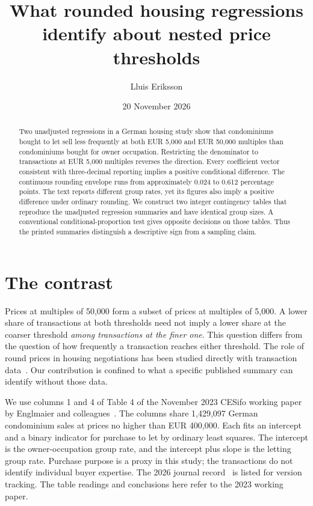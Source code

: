 \documentclass[11pt]{article}
\title{What rounded housing regressions identify about nested price thresholds}
\author{Lluis Eriksson}
\date{20 November 2026}
\begin{document}
\maketitle
\begin{abstract}
Two unadjusted regressions in a German housing study show that condominiums bought to let sell less frequently at both EUR 5,000 and EUR 50,000 multiples than condominiums bought for owner occupation. Restricting the denominator to transactions at EUR 5,000 multiples reverses the direction. Every coefficient vector consistent with three-decimal reporting implies a positive conditional difference. The continuous rounding envelope runs from approximately 0.024 to 0.612 percentage points. The text reports different group rates, yet its figures also imply a positive difference under ordinary rounding. We construct two integer contingency tables that reproduce the unadjusted regression summaries and have identical group sizes. A conventional conditional-proportion test gives opposite decisions on those tables. Thus the printed summaries distinguish a descriptive sign from a sampling claim.
\end{abstract}

\section{The contrast}
Prices at multiples of 50,000 form a subset of prices at multiples of 5,000. A lower share of transactions at both thresholds need not imply a lower share at the coarser threshold \emph{among transactions at the finer one}. This question differs from the question of how frequently a transaction reaches either threshold. The role of round prices in housing negotiations has been studied directly with transaction data~\cite{pope,german}. Our contribution is confined to what a specific published summary can identify without those data.

We use columns 1 and 4 of Table 4 of the November 2023 CESifo working paper by Englmaier and colleagues~\cite{german}. The columns share 1,429,097 German condominium sales at prices no higher than EUR 400,000. Each fits an intercept and a binary indicator for purchase to let by ordinary least squares. The intercept is the owner-occupation group rate, and the intercept plus slope is the letting group rate. Purchase purpose is a proxy in this study; the transactions do not identify individual buyer expertise. The 2026 journal record~\cite{journal} is listed for version tracking. The table readings and conclusions here refer to the 2023 working paper.
\end{document}
